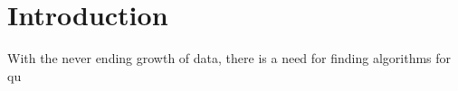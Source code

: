 \chapter*{Introduction}

With the never ending growth of data, there is a need for finding algorithms for qu
